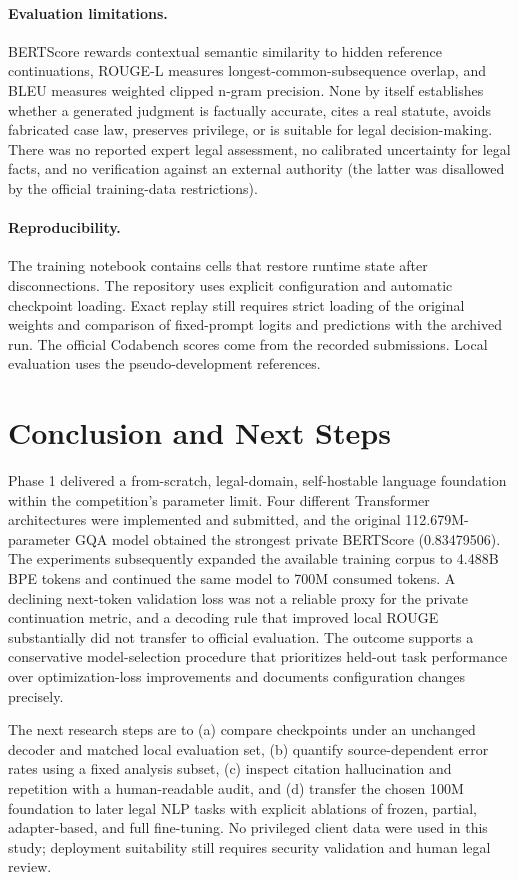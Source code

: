 \documentclass[11pt,a4paper]{article}
\begin{document}
\paragraph{Evaluation limitations.} BERTScore rewards contextual semantic similarity to hidden reference continuations, ROUGE-L measures longest-common-subsequence overlap, and BLEU measures weighted clipped n-gram precision. None by itself establishes whether a generated judgment is factually accurate, cites a real statute, avoids fabricated case law, preserves privilege, or is suitable for legal decision-making. There was no reported expert legal assessment, no calibrated uncertainty for legal facts, and no verification against an external authority (the latter was disallowed by the official training-data restrictions).

\paragraph{Reproducibility.} The training notebook contains cells that restore runtime state after disconnections. The repository uses explicit configuration and automatic checkpoint loading. Exact replay still requires strict loading of the original weights and comparison of fixed-prompt logits and predictions with the archived run. The official Codabench scores come from the recorded submissions. Local evaluation uses the pseudo-development references.

\section{Conclusion and Next Steps}
Phase 1 delivered a from-scratch, legal-domain, self-hostable language foundation within the competition's parameter limit. Four different Transformer architectures were implemented and submitted, and the original 112.679M-parameter GQA model obtained the strongest private BERTScore (0.83479506). The experiments subsequently expanded the available training corpus to 4.488B BPE tokens and continued the same model to 700M consumed tokens. A declining next-token validation loss was not a reliable proxy for the private continuation metric, and a decoding rule that improved local ROUGE substantially did not transfer to official evaluation. The outcome supports a conservative model-selection procedure that prioritizes held-out task performance over optimization-loss improvements and documents configuration changes precisely.

The next research steps are to (a) compare checkpoints under an unchanged decoder and matched local evaluation set, (b) quantify source-dependent error rates using a fixed analysis subset, (c) inspect citation hallucination and repetition with a human-readable audit, and (d) transfer the chosen 100M foundation to later legal NLP tasks with explicit ablations of frozen, partial, adapter-based, and full fine-tuning. No privileged client data were used in this study; deployment suitability still requires security validation and human legal review.
\end{document}
